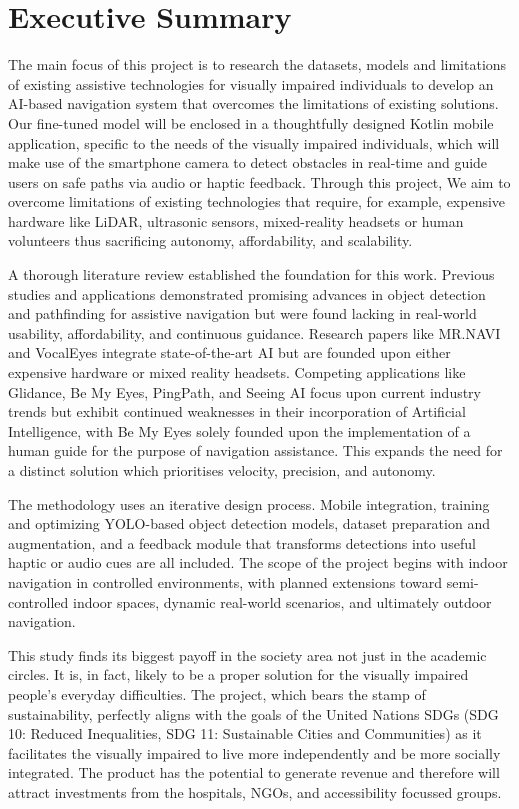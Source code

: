 \documentclass{FastFyp}
\begin{document}
\section*{Executive Summary}
The main focus of this project is to research the datasets, models and limitations of existing assistive technologies for visually impaired individuals to develop an AI-based navigation system that overcomes the limitations of existing solutions. Our fine-tuned model will be enclosed in a thoughtfully designed Kotlin mobile application, specific to the needs of the visually impaired individuals, which will make use of the smartphone camera to detect obstacles in real-time and guide users on safe paths via audio or haptic feedback. Through this project, We aim to overcome limitations of existing technologies that require, for example, expensive hardware like LiDAR, ultrasonic sensors, mixed-reality headsets or human volunteers thus sacrificing autonomy, affordability, and scalability. 

A thorough literature review established the foundation for this work. Previous studies and applications demonstrated promising advances in object detection and pathfinding for assistive navigation but were found lacking in real-world usability, affordability, and continuous guidance. Research papers like MR.NAVI and VocalEyes integrate state-of-the-art AI but are founded upon either expensive hardware or mixed reality headsets. Competing applications like Glidance, Be My Eyes, PingPath, and Seeing AI focus upon current industry trends but exhibit continued weaknesses in their incorporation of Artificial Intelligence, with Be My Eyes solely founded upon the implementation of a human guide for the purpose of navigation assistance. This expands the need for a distinct solution which prioritises velocity, precision, and autonomy.

The methodology uses an iterative design process. Mobile integration, training and optimizing YOLO-based object detection models, dataset preparation and augmentation, and a feedback module that transforms detections into useful haptic or audio cues are all included. The scope of the project begins with indoor navigation in controlled environments, with planned extensions toward semi-controlled indoor spaces, dynamic real-world scenarios, and ultimately outdoor navigation.

This study finds its biggest payoff in the society area not just in the academic circles. It is, in fact, likely to be a proper solution for the visually impaired people's everyday difficulties. The project, which bears the stamp of sustainability, perfectly aligns with the goals of the United Nations SDGs (SDG 10: Reduced Inequalities, SDG 11: Sustainable Cities and Communities) as it facilitates the visually impaired to live more independently and be more socially integrated. The product has the potential to generate revenue and therefore will attract investments from the hospitals, NGOs, and accessibility focussed groups.
\end{document}
